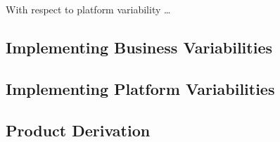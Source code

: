 \documentclass{article}
\begin{document}
With respect to platform variability \ldots

\subsection{Implementing Business Variabilities}

\subsection{Implementing Platform Variabilities}

\subsection{Product Derivation}
\end{document}
